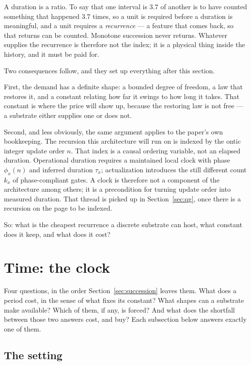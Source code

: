 \documentclass[11pt,a4paper]{article}
\theoremstyle{definition}
\theoremstyle{plain}
\theoremstyle{remark}
\begin{document}
A duration is a ratio. To say that one interval is $3.7$ of another is to
have counted something that happened $3.7$ times, so a unit is required
before a duration is meaningful, and a unit requires a \emph{recurrence}
--- a feature that comes back, so that returns can be counted. Monotone
succession never returns. Whatever supplies the recurrence is therefore
not the index; it is a physical thing inside the history, and it must be
paid for.

Two consequences follow, and they set up everything after this section.

First, the demand has a definite shape: a bounded degree of freedom, a
law that restores it, and a constant relating how far it swings to how
long it takes. That constant is where the price will show up, because the
restoring law is not free --- a substrate either supplies one or does not.

Second, and less obviously, the same argument applies to the paper's own
bookkeeping. The recursion this architecture will run on is indexed by the
ontic integer update order $n$. That index is a causal ordering variable,
not an elapsed duration. Operational duration requires a maintained local
clock with phase $\phi_x(n)$ and inferred duration $\tau_x$; actualization
introduces the still different count $k_x$ of phase-compliant gates. A clock
is therefore not a component of the architecture among others; it is a
precondition for turning update order into measured duration. That thread is
picked up in Section~\ref{sec:qg}, once there is a recursion on the page to
be indexed.

So: what is the cheapest recurrence a discrete substrate can host, what
constant does it keep, and what does it cost?

\section{Time: the clock}
\label{sec:clock}

Four questions, in the order Section~\ref{sec:succession} leaves them.
What does a period cost, in the sense of what fixes its constant? What
shapes can a substrate make available? Which of them, if any, is forced?
And what does the shortfall between those two answers cost, and buy? Each
subsection below answers exactly one of them.

\subsection{The setting}
\end{document}
